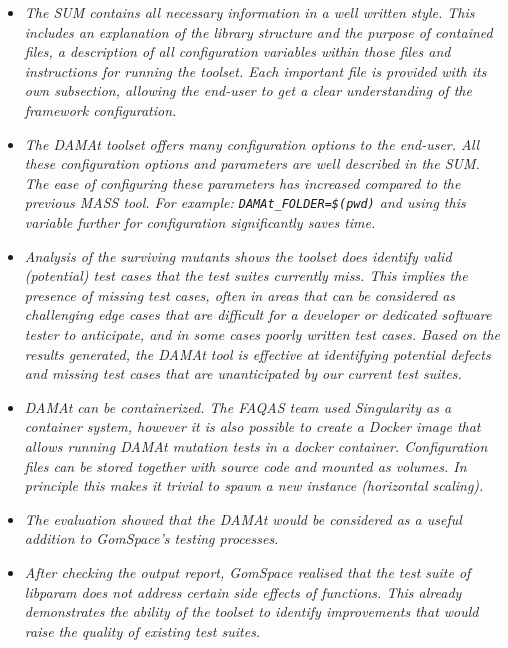 \begin{itemize}
\item \emph{The SUM contains all necessary information in a well written style. This includes an explanation of the library structure and the purpose of contained files, a description of all configuration variables within those files and instructions for running the toolset. Each important file is provided with its own subsection, allowing the end-user to get a clear understanding of the framework configuration.} 

 

\item \emph{The DAMAt toolset offers many configuration options to the end-user. All these configuration options and parameters are well described in the SUM. The ease of configuring these parameters has increased compared to the previous MASS tool. For example: \texttt{DAMAt\_FOLDER=\$(pwd)} and using this variable further for configuration significantly saves time.} 

 

\item \emph{Analysis of the surviving mutants shows the toolset does identify valid (potential) test cases that the test suites currently miss. This implies the presence of missing test cases, often in areas that can be considered as challenging edge cases that are difficult for a developer or dedicated software tester to anticipate, and in some cases poorly written test cases. Based on the results generated, the DAMAt tool is effective at identifying potential defects and missing test cases that are unanticipated by our current test suites.} 

 

\item \emph{DAMAt can be containerized. The FAQAS team used Singularity as a container system, however it is also possible to create a Docker image that allows running DAMAt mutation tests in a docker container. Configuration files can be stored together with source code and mounted as volumes. In principle this makes it trivial to spawn a new instance (horizontal scaling).} 

 

\item \emph{The evaluation showed that the DAMAt would be considered as a useful addition to GomSpace’s testing processes.} 

 

\item \emph{After checking the output report, GomSpace realised that the test suite of libparam does not address certain side effects of functions. This already demonstrates the ability of the toolset to identify improvements that would raise the quality of existing test suites.} 


\end{itemize}
